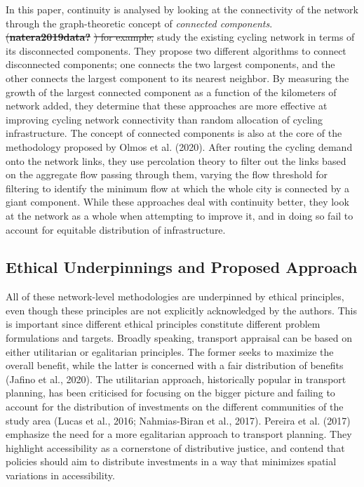 \documentclass[
]{article}
\providecommand{\DIFaddtex}[1]{{\protect\color{blue}\uwave{#1}}} %
\providecommand{\DIFdeltex}[1]{{\protect\color{red}\sout{#1}}}                      %
\providecommand{\DIFaddbegin}{} %
\providecommand{\DIFaddend}{} %
\providecommand{\DIFdelbegin}{} %
\providecommand{\DIFdelend}{} %
\providecommand{\DIFadd}[1]{\texorpdfstring{\DIFaddtex{#1}}{#1}} %
\providecommand{\DIFdel}[1]{\texorpdfstring{\DIFdeltex{#1}}{}} %
\newcommand{\DIFscaledelfig}{0.5}
\newlength{\DIFdelgraphicswidth} %
\newlength{\DIFdelgraphicsheight} %
\newcommand{\DIFaddincludegraphics}[2][]{{\color{blue}\fbox{\DIFOincludegraphics[#1]{#2}}}} %
\newcommand{\DIFdelincludegraphics}[2][]{%
\sbox{\DIFdelgraphicsbox}{\DIFOincludegraphics[#1]{#2}}%
\settoboxwidth{\DIFdelgraphicswidth}{\DIFdelgraphicsbox} %
\settoboxtotalheight{\DIFdelgraphicsheight}{\DIFdelgraphicsbox} %
\scalebox{\DIFscaledelfig}{%
\parbox[b]{\DIFdelgraphicswidth}{\usebox{\DIFdelgraphicsbox}\\[-\baselineskip] \rule{\DIFdelgraphicswidth}{0em}}\llap{\resizebox{\DIFdelgraphicswidth}{\DIFdelgraphicsheight}{%
\setlength{\unitlength}{\DIFdelgraphicswidth}%
\begin{picture}(1,1)%
\thicklines\linethickness{2pt} %
{\color[rgb]{1,0,0}\put(0,0){\framebox(1,1){}}}%
{\color[rgb]{1,0,0}\put(0,0){\line( 1,1){1}}}%
{\color[rgb]{1,0,0}\put(0,1){\line(1,-1){1}}}%
\end{picture}%
}\hspace*{3pt}}} %
} %
\DeclareRobustCommand{\DIFaddbegin}{\DIFOaddbegin \let\includegraphics\DIFaddincludegraphics} %
\DeclareRobustCommand{\DIFaddend}{\DIFOaddend \let\includegraphics\DIFOincludegraphics} %
\DeclareRobustCommand{\DIFdelbegin}{\DIFOdelbegin \let\includegraphics\DIFdelincludegraphics} %
\DeclareRobustCommand{\DIFdelend}{\DIFOaddend \let\includegraphics\DIFOincludegraphics} %
\begin{document}
In this paper, continuity is analysed by looking at the connectivity of
the network through the graph-theoretic concept of \emph{connected
components}. \DIFdelbegin \DIFdel{(}\textbf{\DIFdel{natera2019data?}}%
\DIFdel{) for example,
}\DIFdelend \DIFaddbegin \DIFadd{Orozco et al. (2020) }\DIFaddend study the existing cycling network in terms of its disconnected
components. They propose two different algorithms to connect disconnected components; one connects the two largest components, and the other connects the largest component to its nearest neighbor. By measuring the growth of the largest connected component as a function of the kilometers of network added, they determine that these approaches are more effective at improving cycling network connectivity than random allocation of cycling infrastructure.
The concept of connected components is
also at the core of the methodology proposed by Olmos et al. (2020). After
routing the cycling demand onto the network links, they use percolation
theory to filter out the links based on the aggregate flow passing through them, varying the flow threshold for
filtering to identify the minimum flow at which the whole city is
connected by a giant component. While these approaches deal with
continuity better, they look at the network as a whole when attempting
to improve it, and in doing so fail to account for equitable
distribution of infrastructure.

\hypertarget{ethical-underpinnings-and-proposed-approach}{%
\subsection{Ethical Underpinnings and Proposed Approach}\label{ethical-underpinnings-and-proposed-approach}}

All of these network-level methodologies are underpinned by ethical
principles, even though these principles are not explicitly acknowledged
by the authors. This is important since different ethical principles
constitute different problem formulations and targets. Broadly speaking,
transport appraisal can be based on either utilitarian or egalitarian
principles. The former seeks to maximize the overall benefit, while the
latter is concerned with a fair distribution of benefits
(Jafino et al., 2020).
The utilitarian approach, historically popular in transport planning, has been criticised for focusing on the bigger picture and failing to account for the distribution of investments on the different communities of the study area (Lucas et al., 2016; Nahmias-Biran et al., 2017).
Pereira et al. (2017) emphasize the need for a more
egalitarian approach to transport planning. They highlight accessibility
as a cornerstone of distributive justice, and contend that policies
should aim to distribute investments in a way that minimizes spatial
variations in accessibility.
\end{document}
